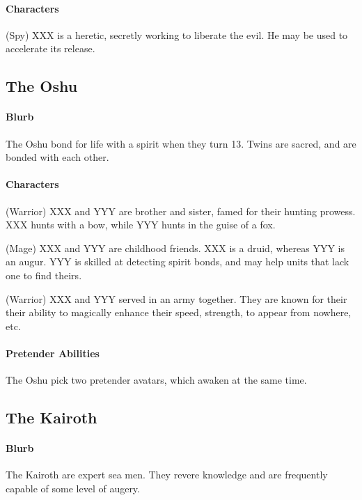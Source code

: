 \documentclass[12pt,letterpaper]{article}
\begin{document}
\paragraph{Characters}

(Spy) XXX is a heretic, secretly working to liberate the evil.
He may be used to accelerate its release.

\subsection{The Oshu}
\paragraph{Blurb}

The Oshu bond for life with a spirit when they turn 13.
Twins are sacred, and are bonded with each other.

\paragraph{Characters}

(Warrior) XXX and YYY are brother and sister, famed for their hunting prowess.
XXX hunts with a bow, while YYY hunts in the guise of a fox.

(Mage) XXX and YYY are childhood friends.
XXX is a druid, whereas YYY is an augur.
YYY is skilled at detecting spirit bonds,
and may help units that lack one to find theirs.

(Warrior) XXX and YYY served in an army together.
They are known for their their ability to magically enhance their
speed, strength, to appear from nowhere, etc.

\paragraph{Pretender Abilities}

The Oshu pick two pretender avatars,
which awaken at the same time.

\subsection{The Kairoth}
\paragraph{Blurb}

The Kairoth are expert sea men.
They revere knowledge and are frequently capable of some level of augery.
\end{document}
